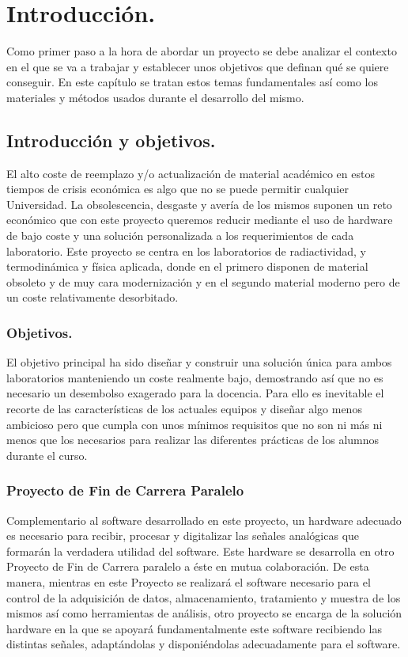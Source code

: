 \chapter{Introducción.}
Como primer paso a la hora de abordar un proyecto se debe analizar el contexto en el que se va a trabajar y establecer unos objetivos que definan qué se quiere conseguir. En este capítulo se tratan estos temas fundamentales así como los materiales y métodos usados durante el desarrollo del mismo.

\section{Introducción y objetivos.}
El alto coste de reemplazo y/o actualización de material académico en estos tiempos de crisis económica es algo que no se puede permitir cualquier Universidad. La obsolescencia, desgaste y avería de los mismos suponen un reto económico que con este proyecto queremos reducir mediante el uso de hardware de bajo coste y una solución personalizada a los requerimientos de cada laboratorio. 
Este proyecto se centra en los laboratorios de radiactividad, y termodinámica y física aplicada, donde en el primero disponen de material obsoleto y de muy cara modernización y en el segundo material moderno pero de un coste relativamente desorbitado.


\subsection{Objetivos.}
El objetivo principal ha sido diseñar y construir una solución única para ambos laboratorios manteniendo un coste realmente bajo, demostrando así que no es necesario un desembolso exagerado para la docencia. Para ello es inevitable el recorte de las características de los actuales equipos y diseñar algo menos ambicioso pero que cumpla con unos mínimos requisitos que no son ni más ni menos que los necesarios para realizar las diferentes prácticas de los alumnos durante el curso.

\subsection{Proyecto de Fin de Carrera Paralelo}
Complementario al software desarrollado en este proyecto, un hardware adecuado es necesario para recibir, procesar y digitalizar las señales analógicas que formarán la verdadera utilidad del software. Este hardware se desarrolla en otro Proyecto de Fin de Carrera paralelo a éste en mutua colaboración.
De esta manera, mientras en este Proyecto se realizará el software necesario para el control de la adquisición de datos, almacenamiento, tratamiento y muestra de los mismos así como herramientas de análisis, otro proyecto se encarga de la solución hardware en la que se apoyará fundamentalmente este software recibiendo las distintas señales, adaptándolas y disponiéndolas adecuadamente para el software.
 
